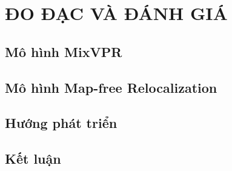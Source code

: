 \chapter{ĐO ĐẠC VÀ ĐÁNH GIÁ}

\section{Mô hình MixVPR}

\section{Mô hình Map-free Relocalization}

\section{Hướng phát triển}

\section{Kết luận}